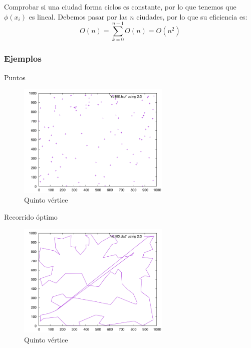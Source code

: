 \begin{frame}
	\begin{block}{ }
	Comprobar si una ciudad forma ciclos es constante, por lo que tenemos que $\phi (x_i)$
	es lineal.
	Debemos pasar por las $n$ ciudades, por lo que su eficiencia es:
	\[O(n) = \sum_{k=0}^{n-1} O(n) = O(n^2) \]
	\end{block}
\end{frame}


\subsubsection{Ejemplos}
\begin{frame}
	\begin{exampleblock}{Puntos}
	\begin{figure}[htbH]
		\centering
		\includegraphics[width=0.65\textwidth]{../Viajante/Imagenes/rd100.png}
		\caption{Quinto vértice}
	\end{figure}
	\end{exampleblock}
\end{frame}

\begin{frame}
	\begin{exampleblock}{ Recorrido óptimo}
	\begin{figure}[htbH]
		\centering
		\includegraphics[width=0.65\textwidth]{../Viajante/Imagenes/rd100_opt.png}
		\caption{Quinto vértice}
	\end{figure}
	\end{exampleblock}
\end{frame}




